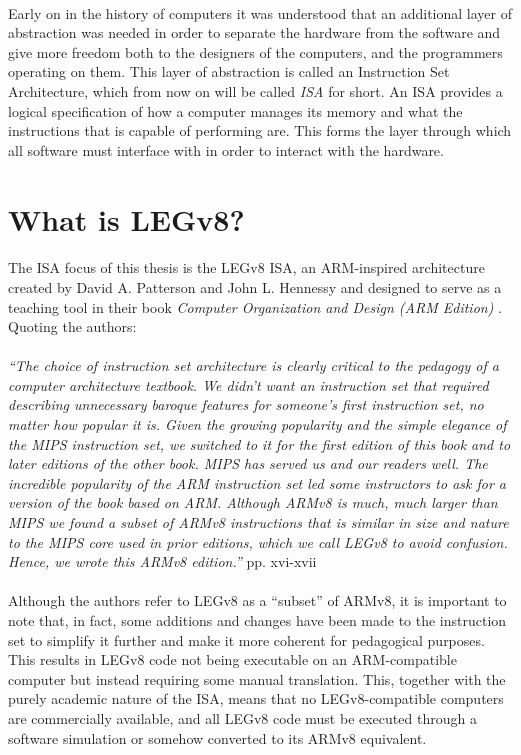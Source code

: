 \paragraph{}
Early on in the history of computers it was understood that an additional layer of abstraction was needed in order to separate the hardware from the software
and give more freedom both to the designers of the computers, and the programmers operating on them. This layer of abstraction is called an Instruction Set Architecture,
which from now on will be called \emph{ISA} for short. An ISA provides a logical specification of how a computer manages its memory and what the instructions that is
capable of performing are. This forms the layer through which all software must interface with in order to interact with the hardware.

\section{What is LEGv8?}

\paragraph{}
The ISA focus of this thesis is the LEGv8 ISA, an ARM-inspired architecture created by David A. Patterson and John L. Hennessy and designed to serve as a teaching
tool in their book \emph{Computer Organization and Design (ARM Edition)} \cite{patterson2016computer}.  Quoting the authors:
\paragraph{}
\emph{``The choice of instruction set architecture is clearly critical to the pedagogy of a
computer architecture textbook. We didn’t want an instruction set that required
describing unnecessary baroque features for someone’s first instruction set, no
matter how popular it is.
Given the growing popularity and the simple elegance of the MIPS instruction
set, we switched to it for the first edition of this book and to later editions of the
other book. MIPS has served us and our readers well.
The incredible popularity of the ARM instruction set led some instructors to ask for a version of the book based on
ARM. Although ARMv8 is much, much larger than MIPS we found a subset of ARMv8
instructions that is similar in size and nature to the MIPS core used in prior editions,
which we call LEGv8 to avoid confusion. Hence, we wrote this ARMv8 edition.''} pp. xvi-xvii
\paragraph{}
Although the authors refer to LEGv8 as a ``subset'' of ARMv8, it is important to note that, in fact, some additions and changes have been made to the instruction set to simplify it further and make it more coherent for pedagogical purposes. This results in LEGv8 code not being executable on an ARM-compatible computer but instead requiring some manual translation. This, together with the purely academic nature of the ISA, means that no LEGv8-compatible computers are commercially available, and all LEGv8 code must be executed through a software simulation or somehow converted to its ARMv8 equivalent.

